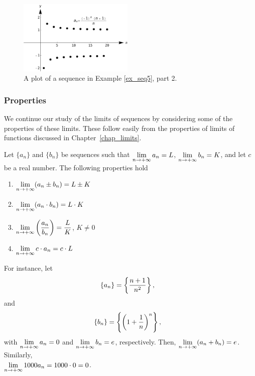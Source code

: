 \begin{example}
\begin{figure}[H]
	\begin{center}
			\includegraphics[width=0.5\textwidth]{fig_series_2}
	\caption{A plot of a sequence in Example \ref{ex_seq5}, part 2.}
	\label{fig_series_2}
	\end{center}
\end{figure}


\end{example}

\subsubsection{Properties}
We continue our study of the limits of sequences by considering some of the properties of these limits. These follow easily from the properties of limits of functions discussed in Chapter~\ref{chap_limits}.


Let $\{a_n\}$ and $\{b_n\}$ be sequences such that $\displaystyle \lim_{n\to+\infty} a_n = L$, $\displaystyle \lim_{n\to+\infty} b_n = K$, and let $c$ be a real number. The following properties hold


\begin{enumerate}
\item		$\displaystyle \lim_{n\to+\infty} (a_n\pm b_n) = L\pm K$
\item		$\displaystyle \lim_{n\to+\infty} (a_n\cdot b_n) = L\cdot K$
\item		$\displaystyle \lim_{n\to+\infty} \left(\dfrac{a_n}{b_n}\right) = \dfrac{L}{K}$, $K\neq 0$
\item		$\displaystyle \lim_{n\to+\infty} c\cdot a_n = c\cdot L$
\end{enumerate}

For instance, let
	$$\displaystyle \{a_n\} = \left\{\frac{n+1}{n^2}\right\},$$
	and
	$$\displaystyle \{b_n\} = \left\{\left(1+\frac1n\right)^{n}\right\},$$
with $\displaystyle \lim_{n\to+\infty} a_n = 0$ and $\displaystyle \lim_{n\to+\infty} b_n = e$, respectively.  Then, $\displaystyle \lim_{n\to+\infty} (a_n+b_n)=e$. Similarly, \\ $\displaystyle \lim_{n\to+\infty} 1000a_n =1000\cdot 0 = 0$. 

